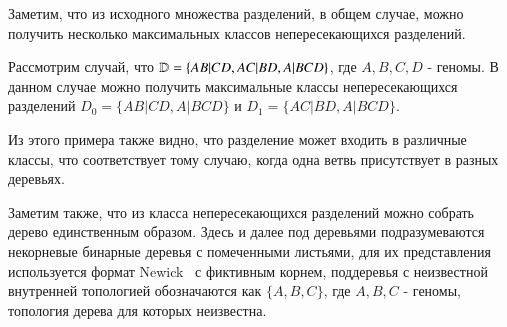 Заметим, что из исходного множества разделений, в общем случае, можно получить несколько максимальных классов непересекающихся разделений.
\begin{example}
  Рассмотрим случай, что $\mathbb{D} = \{ AB|CD, AC|BD, A|BCD \}$, где $A, B, C, D$ - геномы.
  В данном случае можно получить максимальные классы непересекающихся разделений
  $D_0 = \{ AB|CD, A|BCD \}$ и $D_1 = \{ AC|BD, A|BCD \}$.
\end{example}
Из этого примера также видно, что разделение может входить в различные классы, что соответствует тому случаю, когда
одна ветвь присутствует в разных деревьях.


Заметим также, что из класса непересекающихся разделений можно собрать дерево единственным образом.
Здесь и далее под деревьями подразумеваются некорневые бинарные деревья с помеченными листьями,
для их представления используется формат Newick~\cite{newick} с фиктивным корнем,
поддеревья с неизвестной внутренней топологией обозначаются как $\{A, B, C\}$,
где $A, B, C$ - геномы, топология дерева для которых неизвестна.
